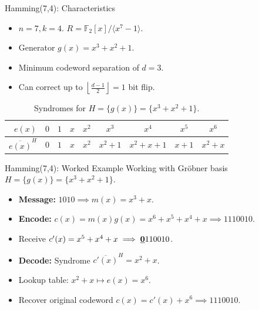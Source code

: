 \documentclass[handout]{beamer}
\newcommand{\F}{\mathbb{F}}
\begin{document}
\begin{frame}{Hamming(7,4): Characteristics}
    \begin{itemize}
        \item $n=7, k=4$. $R = \F_2[x]/\langle x^7-1\rangle$.
        \item Generator $g(x) = x^3+x^2+1$.
        \item Minimum codeword separation of $d=3$.
        \item Can correct up to $\left\lfloor \frac{d-1}{2}\right\rfloor=1$ bit flip.
    \end{itemize}
    
    \begin{table}[h]
        \centering
        \def\arraystretch{1.7}
        \begin{tabular}{r ||c|c|c|c|c|c|c|c}
             $e(x)$ & $0$ & $1$ & $x$ & $x^2$ & $x^3$ & $x^4$ & $x^5$ & $x^6$ \\
             \hline
             $\overline{e(x)}^H$ & $0$ & $1$ & $x$ & $x^2$ & $x^2+1$ & $x^2+x+1$ & $x+1$ & $x^2+x$ \\
    
        \end{tabular}
        \caption{Syndromes for $H=\{g(x)\}=\{x^3+x^2+1\}$.}
        \label{tab:placeholder}
    \end{table}
\end{frame}

\begin{frame}{Hamming(7,4): Worked Example}
    Working with Gr\"obner basis $H=\{g(x)\}=\{x^3+x^2+1\}$.
    \begin{itemize}
        \item \textbf{Message:} $1010 \implies m(x) = x^3+x$.
        \item \textbf{Encode:} $c(x) = m(x)g(x) = x^6+x^5+x^4+x \implies 1110010$.
        \item Receive $c'(x) = x^5+x^4+x \implies \underline{\textbf 0}110010$.
        \item \textbf{Decode:} Syndrome $\overline{c'(x)}^H = x^2+x$.
        \item Lookup table: $x^2+x \mapsto e(x) = x^6$.
        \item Recover original codeword $c(x) = c'(x) + x^6\implies 1110010$.
    \end{itemize}
\end{frame}
\end{document}
